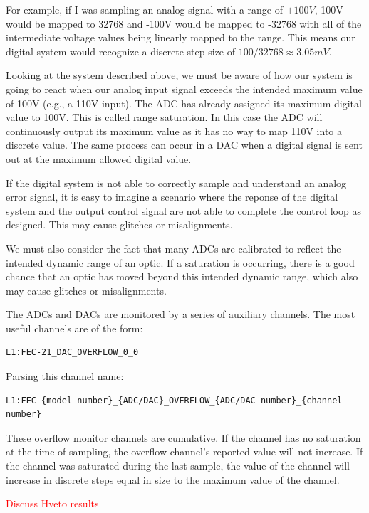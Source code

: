 For example, if I was sampling an analog signal with a range of $\pm100V$, 100V would be mapped to 32768 and -100V would be mapped to -32768 with all of the intermediate voltage values being linearly mapped to the range. This means our digital system would recognize a discrete step size of $100/32768 \approx 3.05 mV$.

Looking at the system described above, we must be aware of how our system is going to react when our analog input signal exceeds the intended maximum value of 100V (e.g., a 110V input). The ADC has already assigned its maximum digital value to 100V. This is called range saturation. In this case the ADC will continuously output its maximum value as it has no way to map 110V into a discrete value. The same process can occur in a DAC when a digital signal is sent out at the maximum allowed digital value.

If the digital system is not able to correctly sample and understand an analog error signal, it is easy to imagine a scenario where the reponse of the digital system and the output control signal are not able to complete the control loop as designed. This may cause glitches or misalignments.

We must also consider the fact that many ADCs are calibrated to reflect the intended dynamic range of an optic.  If a saturation is occurring, there is a good chance that an optic has moved beyond this intended dynamic range, which also may cause glitches or misalignments.

The ADCs and DACs are monitored by a series of auxiliary channels.  The most useful channels are of the form:

\begin{verbatim}
L1:FEC-21_DAC_OVERFLOW_0_0
\end{verbatim}

Parsing this channel name:

\begin{verbatim}
L1:FEC-{model number}_{ADC/DAC}_OVERFLOW_{ADC/DAC number}_{channel number}
\end{verbatim}

These overflow monitor channels are cumulative. If the channel has no saturation at the time of sampling, the overflow channel's reported value will not increase. If the channel was saturated during the last sample, the value of the channel will increase in discrete steps equal in size to the maximum value of the channel.


\textcolor{red}{Discuss Hveto results}

